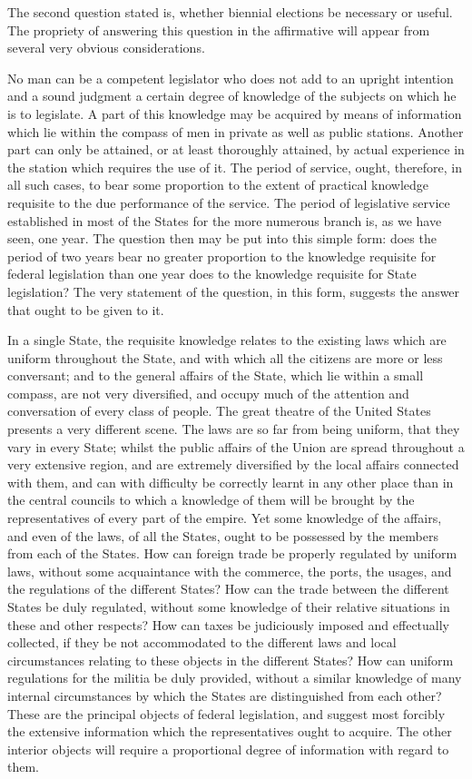 The second question stated is, whether biennial elections be necessary or useful. The propriety of answering this question in the affirmative will appear from several very obvious considerations.

No man can be a competent legislator who does not add to an upright intention and a sound judgment a certain degree of knowledge of the subjects on which he is to legislate. A part of this knowledge may be acquired by means of information which lie within the compass of men in private as well as public stations. Another part can only be attained, or at least thoroughly attained, by actual experience in the station which requires the use of it. The period of service, ought, therefore, in all such cases, to bear some proportion to the extent of practical knowledge requisite to the due performance of the service. The period of legislative service established in most of the States for the more numerous branch is, as we have seen, one year. The question then may be put into this simple form: does the period of two years bear no greater proportion to the knowledge requisite for federal legislation than one year does to the knowledge requisite for State legislation? The very statement of the question, in this form, suggests the answer that ought to be given to it.

In a single State, the requisite knowledge relates to the existing laws which are uniform throughout the State, and with which all the citizens are more or less conversant; and to the general affairs of the State, which lie within a small compass, are not very diversified, and occupy much of the attention and conversation of every class of people. The great theatre of the United States presents a very different scene. The laws are so far from being uniform, that they vary in every State; whilst the public affairs of the Union are spread throughout a very extensive region, and are extremely diversified by the local affairs connected with them, and can with difficulty be correctly learnt in any other place than in the central councils to which a knowledge of them will be brought by the representatives of every part of the empire. Yet some knowledge of the affairs, and even of the laws, of all the States, ought to be possessed by the members from each of the States. How can foreign trade be properly regulated by uniform laws, without some acquaintance with the commerce, the ports, the usages, and the regulations of the different States? How can the trade between the different States be duly regulated, without some knowledge of their relative situations in these and other respects? How can taxes be judiciously imposed and effectually collected, if they be not accommodated to the different laws and local circumstances relating to these objects in the different States? How can uniform regulations for the militia be duly provided, without a similar knowledge of many internal circumstances by which the States are distinguished from each other? These are the principal objects of federal legislation, and suggest most forcibly the extensive information which the representatives ought to acquire. The other interior objects will require a proportional degree of information with regard to them.

